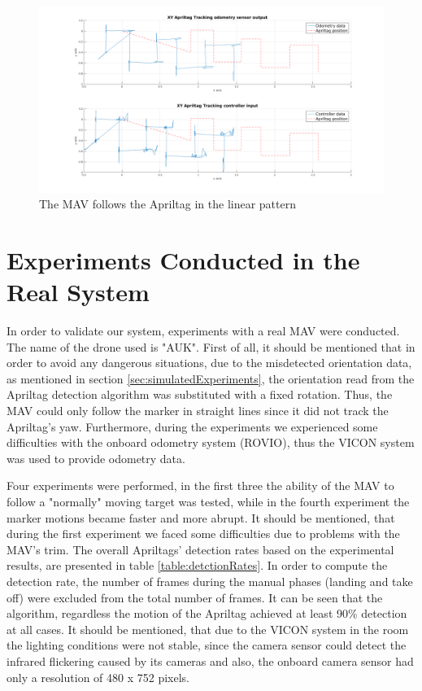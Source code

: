 \begin{figure}
	\centering
	 \includegraphics[width=1.00\textwidth]{images/sim_linear_motion.pdf}
	 \caption{The MAV follows the Apriltag in the linear pattern}
	 \label{pics:simLinearMotion}
\end{figure}

 
\section{Experiments Conducted in the Real System}
\label{sec:realExperiments}

In order to validate our system, experiments with a real MAV were conducted. The name of the drone used is "AUK". First of all, it should be mentioned that in order to avoid any dangerous situations, due to the misdetected orientation data, as mentioned in section \ref{sec:simulatedExperiments}, the orientation read from the Apriltag detection algorithm was substituted with a fixed rotation. Thus, the MAV could only follow the marker in straight lines since it did not track the Apriltag's yaw. Furthermore, during the experiments we experienced some difficulties with the onboard odometry system (ROVIO\protect\footnotemark), thus the VICON system was used to provide odometry data.


Four experiments were performed, in the first three the ability of the MAV to follow a "normally" moving target was tested, while in the fourth experiment the marker motions became faster and more abrupt. It should be mentioned, that during the first experiment we faced some difficulties due to problems with the MAV's trim. The overall Apriltags' detection rates based on the experimental results, are presented in table \ref{table:detctionRates}. In order to compute the detection rate, the number of frames during the manual phases (landing and take off) were excluded from the total number of frames. It can be seen that the algorithm, regardless the motion of the Apriltag achieved at least 90\% detection at all cases. It should be mentioned, that due to the VICON system in the room the lighting conditions were not stable, since the camera sensor could detect the infrared flickering caused by its cameras and also, the onboard camera sensor had only a resolution of 480 x 752 pixels.

